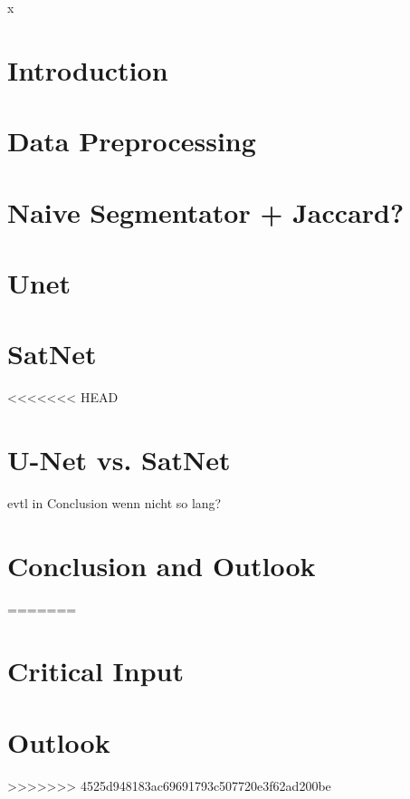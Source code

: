 \documentclass[twoside,12pt]{report}
\begin{document}



\newpage
\thispagestyle{empty}\null\newpage



x
\tableofcontents

\thispagestyle{empty}\null\newpage

\chapter{Introduction}

\chapter{Data Preprocessing}

\chapter{Naive Segmentator + Jaccard?}

\chapter{Unet}


\chapter{SatNet}

<<<<<<< HEAD
\chapter{U-Net vs. SatNet}
evtl in Conclusion wenn nicht so lang?
\chapter{Conclusion and Outlook}
=======
\chapter{Critical Input}

\chapter{Outlook}
>>>>>>> 4525d948183ac69691793c507720e3f62ad200be


% 
\end{document}
